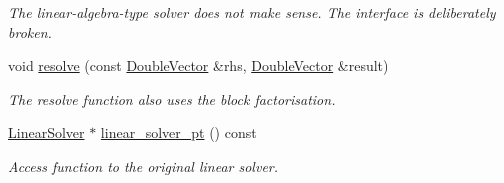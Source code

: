 \begin{DoxyCompactItemize}
\begin{DoxyCompactList}\small\item\em The linear-\/algebra-\/type solver does not make sense. The interface is deliberately broken. \end{DoxyCompactList}\item 
void \hyperlink{classoomph_1_1BlockPitchForkLinearSolver_a9a424fd2ae0b67ef8c3ff59f16030786}{resolve} (const \hyperlink{classoomph_1_1DoubleVector}{Double\+Vector} \&rhs, \hyperlink{classoomph_1_1DoubleVector}{Double\+Vector} \&result)
\begin{DoxyCompactList}\small\item\em The resolve function also uses the block factorisation. \end{DoxyCompactList}\item 
\hyperlink{classoomph_1_1LinearSolver}{Linear\+Solver} $\ast$ \hyperlink{classoomph_1_1BlockPitchForkLinearSolver_a38efead8e84202a3232b4a3624a2986c}{linear\+\_\+solver\+\_\+pt} () const
\begin{DoxyCompactList}\small\item\em Access function to the original linear solver. \end{DoxyCompactList}\end{DoxyCompactItemize}
